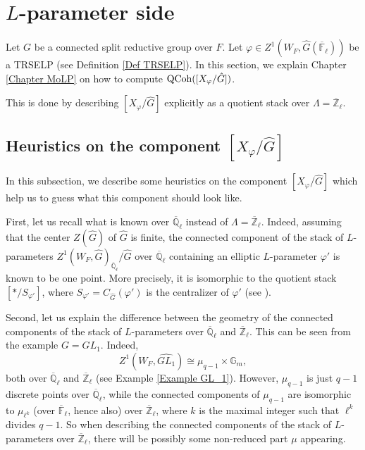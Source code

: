 \section{$L$-parameter side}
Let $G$ be a connected split reductive group over $F$. Let $\varphi \in Z^1(W_F, \hat{G}(\overline{\mathbb{F}}_{\ell}))$ be a TRSELP (see Definition \ref{Def TRSELP}). In this section, we explain Chapter \ref{Chapter MoLP} on how to compute $\operatorname{\operatorname{QCoh}}([X_{\varphi}/\hat{G}])$. 

This is done by describing $[X_{\varphi}/\hat{G}]$ explicitly as a quotient stack over $\Lambda=\overline{\mathbb{Z}}_{\ell}$. 

\subsection{Heuristics on the component $[X_{\varphi}/\hat{G}]$}

In this subsection, we describe some heuristics on the component $[X_{\varphi}/\hat{G}]$ which help us to guess what this component should look like.

First, let us recall what is known over $\overline{\mathbb{Q}}_{\ell}$ instead of $\Lambda=\overline{\mathbb{Z}}_{\ell}$. Indeed, assuming that the center $Z(\hat{G})$ of $\hat{G}$ is finite, the connected component of the stack of $L$-parameters $Z^1(W_F, \hat{G})_{\overline{\mathbb{Q}}_{\ell}}/\hat{G}$ over $\overline{\mathbb{Q}}_{\ell}$ containing an elliptic $L$-parameter $\varphi'$ is known to be one point. More precisely, it is isomorphic to the quotient stack $[*/S_{\varphi'}]$, where $S_{\varphi'}=C_{\hat{G}}(\varphi')$ is the centralizer of $\varphi'$ (see \cite[Section X.2]{fargues2021geometrization}).

Second, let us explain the difference between the geometry of the connected components of the stack of $L$-parameters over $\overline{\mathbb{Q}}_{\ell}$ and $\overline{\mathbb{Z}}_{\ell}$. This can be seen from the example $G=GL_1$. Indeed, 
$$Z^1(W_F, \widehat{GL_1}) \cong \mu_{q-1} \times \mathbb{G}_m,$$
both over $\overline{\mathbb{Q}}_{\ell}$ and $\overline{\mathbb{Z}}_{\ell}$ (see Example \ref{Example GL_1}). However, $\mu_{q-1}$ is just $q-1$ discrete points over $\overline{\mathbb{Q}}_{\ell}$, while
the connected components of $\mu_{q-1}$ are isomorphic to $\mu_{\ell^k}$ (over $\overline{\mathbb{F}}_{\ell}$, hence also) over $\overline{\mathbb{Z}}_{\ell}$, where $k$ is the maximal integer such that $\ell^k$ divides $q-1$. So when describing the connected components of the stack of $L$-parameters over $\overline{\mathbb{Z}}_{\ell}$, there will be possibly some non-reduced part $\mu$ appearing.

